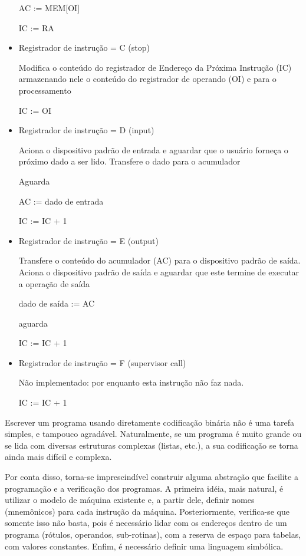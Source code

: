 \begin{itemize}
	AC := MEM[OI]			

	IC := RA 	 	 	 		

			
	\item Registrador de instrução = C (stop)

	Modifica o conteúdo do registrador de Endereço da Próxima Instrução (IC) armazenando nele o conteúdo do registrador de operando (OI) e para o processamento

	IC := OI

	\item Registrador de instrução = D (input)
 					
	Aciona o dispositivo padrão de entrada e aguardar que o usuário forneça o próximo dado a ser lido. Transfere o dado para o acumulador 

	Aguarda
	
	AC := dado de entrada 
	
	IC := IC + 1 
		
	\item Registrador de instrução = E (output)

	Transfere o conteúdo do acumulador (AC) para o dispositivo padrão de saída. Aciona o dispositivo padrão de saída e aguardar que este termine de executar a operação de saída 

	dado de saída := AC 

	aguarda
	
	IC := IC + 1

	\item Registrador de instrução = F (supervisor call)

	Não implementado: por enquanto esta instrução não faz nada.

	IC := IC + 1
\end{itemize}

Escrever um programa usando diretamente codificação binária não é uma tarefa simples, e tampouco agradável. Naturalmente, se um programa é muito grande ou se lida com diversas estruturas complexas (listas, etc.), a sua codificação se torna ainda mais difícil e complexa.

Por conta disso, torna-se imprescindível construir alguma abstração que facilite a programação e a verificação dos programas. A primeira idéia, mais natural, é utilizar o modelo de máquina existente e, a partir dele, definir nomes (mnemônicos) para cada instrução da máquina. Posteriormente, verifica-se que somente isso não basta, pois é necessário lidar com os endereços dentro de um programa (rótulos, operandos, sub-rotinas), com a reserva de espaço para tabelas, com valores constantes. Enfim, é necessário definir uma linguagem simbólica.

